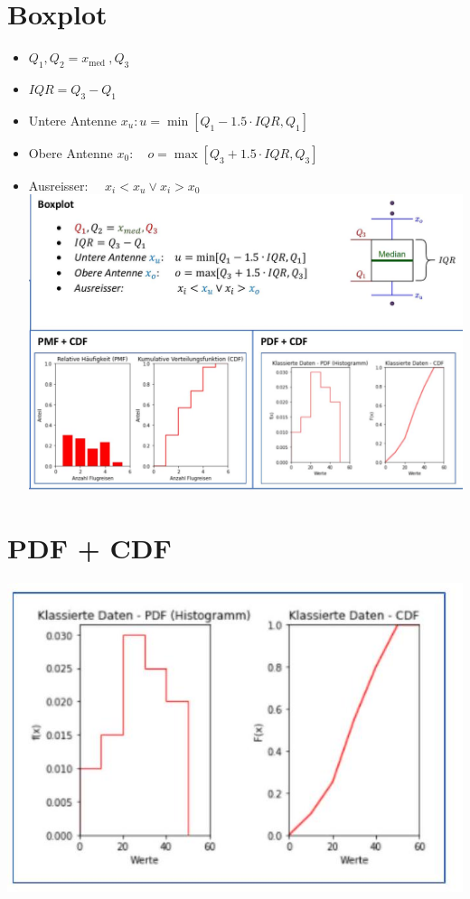 \documentclass[10pt]{article}
\begin{document}
\section*{Boxplot}
\begin{itemize}
  \item $Q_{1}, Q_{2}=x_{\text {med }}, Q_{3}$
  \item $I Q R=Q_{3}-Q_{1}$
  \item Untere Antenne $x_{u}: u=\min \left[Q_{1}-1.5 \cdot I Q R, Q_{1}\right]$
  \item Obere Antenne $x_{0}: \quad o=\max \left[Q_{3}+1.5 \cdot I Q R, Q_{3}\right]$
  \item Ausreisser: $\quad x_{i}<x_{u} \vee x_{i}>x_{0}$\\
\includegraphics[width=\linewidth]{images/2024_12_29_e932069dd64ad17e4875g-01(1)}
\end{itemize}

\section*{PDF + CDF}
\begin{center}
\includegraphics[width=\linewidth]{images/2024_12_29_e932069dd64ad17e4875g-01}
\end{center}
\end{document}

